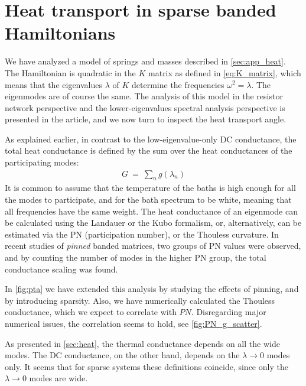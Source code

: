 \section{Heat transport in sparse banded Hamiltonians}\label{sec:PTA}


We have analyzed a model of springs and masses described in \autoref{sec:app_heat}.
The Hamiltonian is quadratic in the $K$ matrix as defined in \autoref{eq:K_matrix},
which means that the eigenvalues $\lambda$ of $K$ determine the frequencies $\omega^2 = \lambda$.
The eigenmodes are of course the same. The analysis of this model in the resistor network perspective
and the lower-eigenvalues spectral analysis perspective is presented in the article, and we now
turn to inspect the heat transport angle.


As explained earlier, in contrast to the low-eigenvalue-only DC conductance, 
the total heat conductance is defined by the
sum over the heat conductances of the participating modes:
%
\begin{align}
G \ =\ \sum_n g(\lambda_n)
\end{align}
%
It is common to assume
that the temperature of the baths is high enough for all the modes to
participate, and for the bath spectrum to be white, meaning that all frequencies
have the same weight. The heat conductance of an eigenmode can be calculated
using the Landauer or the Kubo formalism, or, alternatively, can be estimated
via the PN (participation number), or the Thouless curvature. 
In recent studies \cite{bodyfelt_unpub} of \emph{pinned}\cite{roy_role_2008} banded matrices,
two groups of PN values were observed, and by counting the number of modes in the
higher PN group, the total conductance scaling was found. 



In \autoref{fig:pta} we have extended this analysis by studying the
effects of pinning, and by introducing sparsity. Also, we have
numerically calculated the Thouless conductance,
which we expect to correlate with $PN$. Disregarding major numerical issues,
the correlation seems to hold, see \autoref{fig:PN_g_scatter}.


As presented in \autoref{sec:heat}, the thermal conductance depends
on all the wide modes. The DC conductance, on the other hand,
depends on the $\lambda\rightarrow 0$ modes only. It seems that
for sparse systems these definitions coincide, since only 
the $\lambda\rightarrow 0$ modes are wide.



